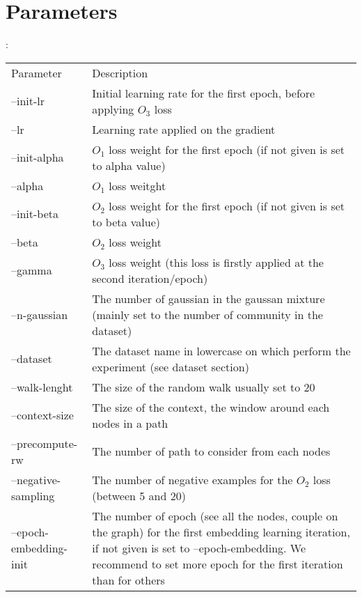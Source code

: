 \documentclass{article}
\begin{document}
    \section{Parameters}:
        \begin{table}
            \centering
            \begin{tabular}{l|p{10cm}}
                \hline
                Parameter & Description \\
                --init-lr & Initial learning rate for the first epoch, before applying $O_3$ loss \\
                --lr & Learning rate applied on the gradient \\
                --init-alpha & $O_1$ loss weight for the first epoch (if not given is set to alpha value) \\
                --alpha & $O_1$ loss weitght \\
                --init-beta & $O_2$ loss weight for the first epoch (if not given is set to beta value) \\
                --beta & $O_2$ loss weight \\
                \hline
                \hline
                --gamma & $O_3$ loss weight (this loss is firstly applied at the second iteration/epoch) \\
                --n-gaussian & The number of gaussian in the gaussan mixture (mainly set to the number of community in the dataset) \\
                \hline
                --dataset & The dataset name in lowercase on which perform the experiment (see dataset section) \\
                \hline
                \hline
                --walk-lenght & The size of the random walk usually set to 20 \\
                --context-size & The size of the context, the window around each nodes in a path \\
                --precompute-rw & The number of path to consider from each nodes \\
                \hline
                \hline
                --negative-sampling & The number of negative examples for the $O_2$ loss (between 5 and 20) \\
                \hline
                \hline
                --epoch-embedding-init & The number of epoch (see all the nodes, couple on the graph) for the first embedding learning iteration, if not given is set to --epoch-embedding. We recommend to set more epoch for the first iteration than for others \\

\end{tabular}
\end{table}
\end{document}

